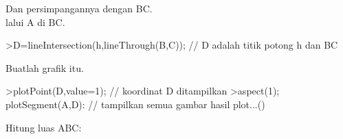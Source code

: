 \documentclass[12pt,arial,letterpaper]{book}
\begin{document}
\begin{eulercomment}
\begin{eulercomment}
\begin{eulercomment}
\begin{eulercomment}
\begin{eulercomment}
\begin{eulercomment}
\begin{eulercomment}
\begin{eulercomment}
\begin{eulercomment}
\begin{eulercomment}
\begin{eulercomment}
\begin{eulercomment}
\begin{eulercomment}
\begin{eulercomment}
\begin{eulercomment}
\begin{eulercomment}
\begin{eulercomment}
\begin{eulercomment}
\begin{eulercomment}
\begin{eulercomment}
\begin{eulercomment}
\begin{eulercomment}
\begin{eulercomment}
\begin{eulercomment}
\begin{eulercomment}
Dan persimpangannya dengan BC.\\
lalui A di BC.
\end{eulercomment}
\begin{eulerprompt}
>D=lineIntersection(h,lineThrough(B,C)); // D adalah titik potong h dan BC
\end{eulerprompt}
\begin{eulercomment}
Buatlah grafik itu.
\end{eulercomment}
\begin{eulerprompt}
>plotPoint(D,value=1); // koordinat D ditampilkan
>aspect(1); plotSegment(A,D): // tampilkan semua gambar hasil plot...()
\end{eulerprompt}
\begin{eulercomment}
Hitung luas ABC:


\end{eulercomment}
\end{eulercomment}
\end{eulercomment}
\end{eulercomment}
\end{eulercomment}
\end{eulercomment}
\end{eulercomment}
\end{eulercomment}
\end{eulercomment}
\end{eulercomment}
\end{eulercomment}
\end{eulercomment}
\end{eulercomment}
\end{eulercomment}
\end{eulercomment}
\end{eulercomment}
\end{eulercomment}
\end{eulercomment}
\end{eulercomment}
\end{eulercomment}
\end{eulercomment}
\end{eulercomment}
\end{eulercomment}
\end{eulercomment}
\end{eulercomment}
\end{document}
